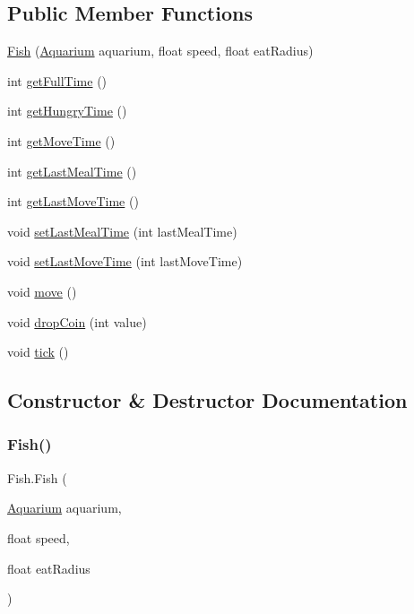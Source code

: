 \subsection*{Public Member Functions}
\begin{DoxyCompactItemize}
\item 
\mbox{\hyperlink{class_fish_adc54cd97ba29e2bce4f102f2d8cd3b99}{Fish}} (\mbox{\hyperlink{class_aquarium}{Aquarium}} aquarium, float speed, float eat\+Radius)
\item 
int \mbox{\hyperlink{class_fish_ad8e2387d09b2a4b10f3581797551f82c}{get\+Full\+Time}} ()
\item 
int \mbox{\hyperlink{class_fish_af9203b3a4949cac453fc8d18355af9b5}{get\+Hungry\+Time}} ()
\item 
int \mbox{\hyperlink{class_fish_af967adfd2d8b4486175131509fcf541b}{get\+Move\+Time}} ()
\item 
int \mbox{\hyperlink{class_fish_a84aaee65d812cd3f8357c9173ec13b75}{get\+Last\+Meal\+Time}} ()
\item 
int \mbox{\hyperlink{class_fish_a57dcae78fad400c6b8e09f1443acf491}{get\+Last\+Move\+Time}} ()
\item 
void \mbox{\hyperlink{class_fish_aedb34efda974a200bd6b929e26955080}{set\+Last\+Meal\+Time}} (int last\+Meal\+Time)
\item 
void \mbox{\hyperlink{class_fish_a5c8ba21e13233735384d25a521a6b022}{set\+Last\+Move\+Time}} (int last\+Move\+Time)
\item 
void \mbox{\hyperlink{class_fish_ad624caf044894e5c4350cd69ef846833}{move}} ()
\item 
void \mbox{\hyperlink{class_fish_a7ce58f40d4cfeb6472788af5627252c1}{drop\+Coin}} (int value)
\item 
void \mbox{\hyperlink{class_fish_aefe1a78dd5e5bf6a4f152c948d701a09}{tick}} ()
\end{DoxyCompactItemize}


\subsection{Constructor \& Destructor Documentation}
\mbox{\label{class_fish_adc54cd97ba29e2bce4f102f2d8cd3b99}} 
\subsubsection{\texorpdfstring{Fish()}{Fish()}}
{\footnotesize\ttfamily Fish.\+Fish (\begin{DoxyParamCaption}\item[{\mbox{\hyperlink{class_aquarium}{Aquarium}}}]{aquarium,  }\item[{float}]{speed,  }\item[{float}]{eat\+Radius }\end{DoxyParamCaption})\hspace{0.3cm}{\ttfamily [inline]}}

